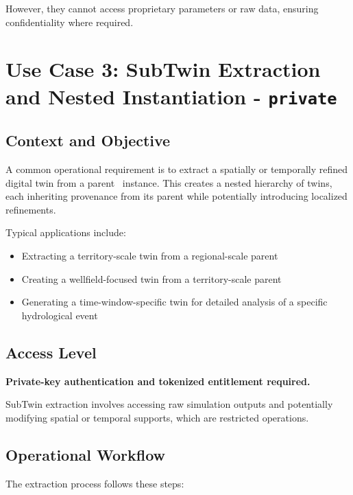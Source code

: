 However, they cannot access proprietary parameters or raw data, ensuring confidentiality where required.


\section{Use Case 3: SubTwin Extraction and Nested Instantiation - \texttt{private}}

\subsection{Context and Objective}

A common operational requirement is to extract a spatially or temporally refined digital twin from a parent \hydrot\ instance. This creates a nested hierarchy of twins, each inheriting provenance from its parent while potentially introducing localized refinements.

Typical applications include:

\begin{itemize}
\item Extracting a territory-scale twin from a regional-scale parent
\item Creating a wellfield-focused twin from a territory-scale parent
\item Generating a time-window-specific twin for detailed analysis of a specific hydrological  event
\end{itemize}

\subsection{Access Level}

\textbf{Private-key authentication and tokenized entitlement required.}

SubTwin extraction involves accessing raw simulation outputs and potentially modifying spatial or temporal supports, which are restricted operations.

\subsection{Operational Workflow}

The extraction process follows these steps:


